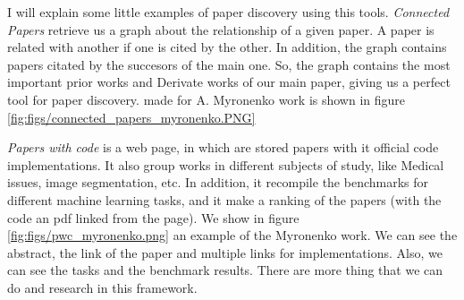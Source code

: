 I will explain some little examples of paper discovery using this tools. \textit{Connected Papers} retrieve us a graph about the relationship of a given paper. A paper is related with another if one is cited by the other. In addition, the graph contains papers citated by the succesors of the main one. So, the graph contains the most important prior works and Derivate works of our main paper, giving us a perfect tool for paper discovery.  made for A. Myronenko work \cite{myronenko20183d} is shown in figure \ref{fig:figs/connected_papers_myronenko.PNG} 
 

\textit{Papers with code} is a web page, in which are stored papers with it official code implementations. It also group works in different subjects of study, like Medical issues, image segmentation, etc. In addition, it recompile the benchmarks for different machine learning tasks, and it make a ranking of the papers (with the code an pdf linked from the page). We show in figure \ref{fig:figs/pwc_myronenko.png} an example of the Myronenko work. We can see the abstract, the link of the paper and multiple links for implementations. Also, we can see the tasks and the benchmark results. There are more thing that we can do and research in this framework. 

